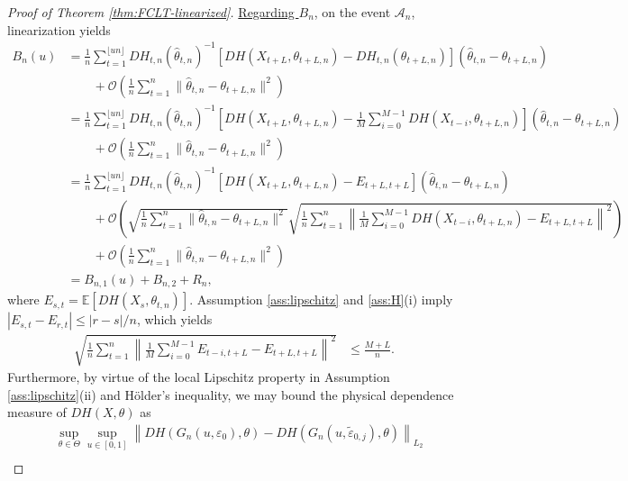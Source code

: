 \documentclass[10pt, a4paper]{article}
\theoremstyle{assumption}
\theoremstyle{definition}
\theoremstyle{theorem}
\newcommand{\E}{\mathbb{E}}
\begin{document}
\begin{proof}[Proof of Theorem \ref{thm:FCLT-linearized}]
    \underline{Regarding $B_n$}, on the event $\mathcal{A}_n$, linearization yields
    \begin{align*}
        B_n(u)
        &= \frac{1}{n} \sum_{t=1}^{\lfloor un \rfloor} DH_{t,n}(\widehat{\theta}_{t,n})^{-1} \left[ D H(X_{t+L}, \theta_{t+L,n}) - DH_{t,n}(\theta_{t+L,n})\right](\widehat{\theta}_{t,n}-\theta_{t+L,n}) \\
        &\qquad + \mathcal{O}\left( \frac{1}{n}\sum_{t=1}^n \|\widehat{\theta}_{t,n}-\theta_{t+L,n}\|^2 \right) \\
        &= \frac{1}{n} \sum_{t=1}^{\lfloor un \rfloor} DH_{t,n}(\widehat{\theta}_{t,n})^{-1} \left[ D H(X_{t+L}, \theta_{t+L,n}) - \frac{1}{M} \sum_{i=0}^{M-1} DH(X_{t-i}, \theta_{t+L,n})\right](\widehat{\theta}_{t,n}-\theta_{t+L,n}) \\
        &\qquad + \mathcal{O}\left( \frac{1}{n}\sum_{t=1}^n \|\widehat{\theta}_{t,n}-\theta_{t+L,n}\|^2 \right) \\
        &= \frac{1}{n} \sum_{t=1}^{\lfloor un \rfloor} DH_{t,n}(\widehat{\theta}_{t,n})^{-1} \left[ D H(X_{t+L}, \theta_{t+L,n}) - E_{t+L,t+L} \right](\widehat{\theta}_{t,n}-\theta_{t+L,n}) \\
        &\qquad + \mathcal{O}\left( \sqrt{ \frac{1}{n}\sum_{t=1}^n \|\widehat{\theta}_{t,n}-\theta_{t+L,n}\|^2} \sqrt{  \frac{1}{n}\sum_{t=1}^n \left\| \frac{1}{M} \sum_{i=0}^{M-1} DH(X_{t-i}, \theta_{t+L,n}) -E_{t+L,t+L}  \right\|^2  } \right) \\
        &\qquad + \mathcal{O}\left( \frac{1}{n}\sum_{t=1}^n \|\widehat{\theta}_{t,n}-\theta_{t+L,n}\|^2 \right) \\
        &= B_{n,1}(u) + B_{n,2} + R_n,
    \end{align*}
    where $E_{s,t}=\E [DH(X_s, \theta_{t,n})]$.
    Assumption \ref{ass:lipschitz} and \ref{ass:H}(i) imply $|E_{s,t}-E_{r,t}|\leq |r-s|/n$, which yields
    \begin{align*}
        \sqrt{\frac{1}{n}\sum_{t=1}^n \left\| \frac{1}{M} \sum_{i=0}^{M-1} E_{t-i,t+L} -E_{t+L,t+L} \right\|^2 }
        &\leq \frac{M+L}{n}.
    \end{align*}
    Furthermore, by virtue of the local Lipschitz property in Assumption \eqref{ass:lipschitz}(ii) and Hölder's inequality, we may bound the physical dependence measure of $DH(X,\theta)$ as
    \begin{align*}
        &\sup_{\theta\in\Theta} \sup_{u\in[0,1]}\left\|DH(G_n(u,\varepsilon_0),\theta) - DH(G_n(u,\tilde{\varepsilon}_{0, j}),\theta) \right\|_{L_2} \\

\end{align*}
\end{proof}
\end{document}
